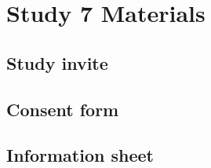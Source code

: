 \chapter{Study 7 Materials}\label{ch:S7_Materials}

\section{Study invite}

\section{Consent form}

\section{Information sheet}


